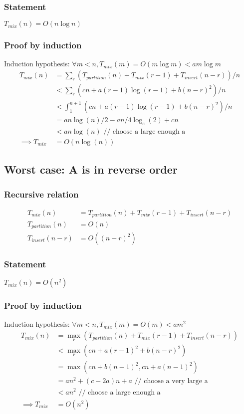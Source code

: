 \documentclass{article}
\begin{document}
\subsubsection{Statement}
$T_{mix}(n) = O(n \log n)$

\subsubsection{Proof by induction}
Induction hypothesis: $\forall m < n, T_{mix}(m) = O(m \log m) < am \log m$
\begin{align*}
T_{mix}(n)
&= \sum_r (T_{partition}(n) + T_{mix}(r-1) + T_{insert}(n-r))/n\\
&< \sum_r (cn + a(r-1) \log (r-1) + b(n-r)^2)/n\\
&< \int_1^{n+1} (cn + a(r-1) \log (r-1) + b(n-r)^2)/n\\
&= an \log(n)/2 - an/4 \log_e(2) + cn\\
&< an \log(n) \text{ // choose a large enough a}\\
\implies T_{mix} &= O(n \log(n))
\end{align*}

\subsection{Worst case: A is in reverse order}

\subsubsection{Recursive relation}
\begin{align*}
T_{mix}(n) &= T_{partition}(n) + T_{mix}(r-1) + T_{insert}(n-r)\\
T_{partition}(n) &= O(n)\\
T_{insert}(n-r) &= O((n-r)^2)
\end{align*}

\subsubsection{Statement}
$T_{mix}(n) = O(n^2)$

\subsubsection{Proof by induction}
Induction hypothesis: $\forall m < n, T_{mix}(m) = O(m) < am^2$
\begin{align*}
T_{mix}(n)
&= \max_r (T_{partition}(n) + T_{mix}(r-1) + T_{insert}(n-r))\\
&< \max_r(cn + a(r-1)^2 + b(n-r)^2)\\
&= \max (cn + b(n-1)^2, cn + a(n-1)^2)\\
&= an^2 + (c-2a)n + a \text{ // choose a very large a}\\
&< an^2 \text{ // choose a large enough a}\\
\implies T_{mix} &= O(n^2)
\end{align*}
\end{document}
